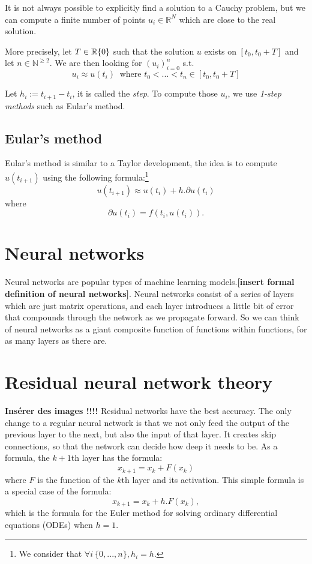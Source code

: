 \documentclass[10pt,a4paper]{article}
\theoremstyle{definition}
\theoremstyle{theorem}
\begin{document}
It is not always possible to explicitly find a solution to a Cauchy problem, but we can compute a finite number of points $u_i \in \mathbb{R}^N$ which are close to the real solution. 

More precisely, let $T \in \mathbb{R}\\\{0\}$ such that the solution $u$ exists on $[t_0, t_0 + T]$ and let $n \in \mathbb{N}^{\geqslant 2}$. We are then looking for $(u_i)^n_{i=0}$ s.t. 
\[
u_i \approx u(t_i) \ \text{ where } t_0 < ... < t_n \in [t_0, t_0 + T]
\]

Let $h_i := t_{i+1} - t_i$, it is called the \textit{step}. To compute those $u_i$, we use \textit{1-step methods} such as Eular's method.

\subsection{Eular's method}

Eular's method is similar to a Taylor development, the idea is to compute $u(t_{i+1})$ using the following formula:\footnote{We consider that $ \forall i\ \{0,...,n\}, h_i = h$.}
\[
u(t_{i+1}) \approx u(t_i) + h . \partial u(t_i)
\]
where 
\[
\partial u(t_i) = f(t_i, u(t_i)).
\]

\section{Neural networks}
Neural networks are popular types of machine learning models.\textbf{[insert formal definition of neural networks]}.
Neural networks consist of a series of layers which are just matrix operations, and each layer introduces a little bit of error that compounds through the network as we propagate forward. 
So we can think of neural networks as a giant composite function of functions within functions, for as many layers as there are.

\section{Residual neural network theory}
\textbf{Insérer des images !!!!}
Residual networks have the best accuracy. The only change to a regular neural network is that we not only feed the output of the previous layer to the next, but also the input of that layer. It creates skip connections, so that the network can decide how deep it needs to be. As a formula, the $k+1$th layer has the formula:
\[
x_{k+1} = x_k + F(x_k)
\]
where $F$ is the function of the $k$th layer and its activation. This simple formula is a special case of the formula:
\[
x_{k+1} = x_k + h.F(x_k),
\]
which is the formula for the Euler method for solving ordinary differential equations (ODEs) when $h = 1$.
\end{document}

